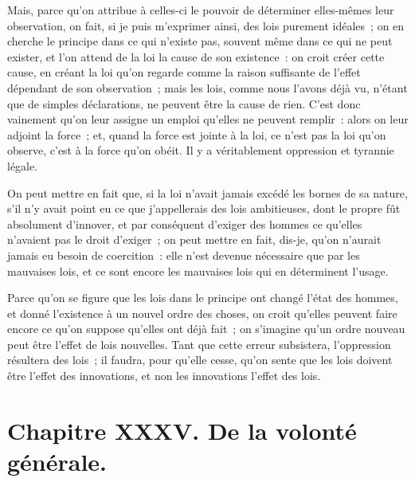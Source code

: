 \documentclass[french,twoside]{book} %
\newcommand\chapteropen{} %
\newcommand\chapterclose{} %
\begin{document}
Mais, parce qu’on attribue à celles-ci le pouvoir de déterminer elles-mêmes leur observation, on fait, si je puis m’exprimer ainsi, des lois purement idéales ; on en cherche le principe dans ce qui n’existe pas, souvent même dans ce qui ne peut exister, et l’on attend de la loi la cause de son existence : on croit créer cette cause, en créant la loi qu’on regarde comme la raison suffisante de l’effet dépendant de son observation ; mais les lois, comme nous l’avons déjà vu, n’étant que de simples déclarations, ne peuvent être la cause de rien. C’est donc vainement qu’on leur assigne un emploi qu’elles ne peuvent remplir : alors on leur adjoint la force ; et, quand la force est jointe à la loi, ce n’est pas la loi qu’on observe, c’est à la force qu’on obéit. Il y a véritablement oppression et tyrannie légale.\par
On peut mettre en fait que, si la loi n’avait jamais excédé les bornes de sa nature, s’il n’y avait point eu ce que j’appellerais des lois ambitieuses, dont le propre fût absolument d’innover, et par conséquent d’exiger des hommes ce qu’elles n’avaient pas le droit d’exiger ; on peut mettre en fait, dis-je, qu’on n’aurait jamais eu besoin de coercition : elle n’est devenue nécessaire que par les mauvaises lois, et ce sont encore les mauvaises lois qui en déterminent l’usage.\par
Parce qu’on se figure que les lois dans le principe ont changé l’état des hommes, et donné l’existence à un nouvel ordre des choses, on croit qu’elles peuvent faire encore ce qu’on suppose qu’elles ont déjà fait ; on s’imagine qu’un ordre nouveau peut être l’effet de lois nouvelles. Tant que cette erreur subsistera, l’oppression résultera des lois ; il faudra, pour qu’elle cesse, qu’on sente que les lois doivent être l’effet des innovations, et non les innovations l’effet des lois.
\chapterclose


\chapteropen
\chapter[{Chapitre XXXV. De la volonté générale.}]{Chapitre XXXV. De la volonté générale.}\renewcommand{\leftmark}{Chapitre XXXV. De la volonté générale.}
\end{document}
